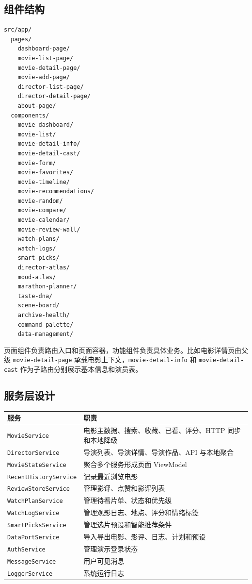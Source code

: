 \documentclass[
]{ctexart}
\begin{document}
\hypertarget{ux7ec4ux4ef6ux7ed3ux6784}{%
\subsection{组件结构}\label{ux7ec4ux4ef6ux7ed3ux6784}}

\begin{verbatim}
src/app/
  pages/
    dashboard-page/
    movie-list-page/
    movie-detail-page/
    movie-add-page/
    director-list-page/
    director-detail-page/
    about-page/
  components/
    movie-dashboard/
    movie-list/
    movie-detail-info/
    movie-detail-cast/
    movie-form/
    movie-favorites/
    movie-timeline/
    movie-recommendations/
    movie-random/
    movie-compare/
    movie-calendar/
    movie-review-wall/
    watch-plans/
    watch-logs/
    smart-picks/
    director-atlas/
    mood-atlas/
    marathon-planner/
    taste-dna/
    scene-board/
    archive-health/
    command-palette/
    data-management/
\end{verbatim}

页面组件负责路由入口和页面容器，功能组件负责具体业务。比如电影详情页由父级
\texttt{movie-detail-page} 承载电影上下文，\texttt{movie-detail-info} 和
\texttt{movie-detail-cast} 作为子路由分别展示基本信息和演员表。

\hypertarget{ux670dux52a1ux5c42ux8bbeux8ba1}{%
\subsection{服务层设计}\label{ux670dux52a1ux5c42ux8bbeux8ba1}}

\begin{longtable}[]{@{}ll@{}}
\toprule
服务 & 职责 \\
\midrule
\endhead
\texttt{MovieService} & 电影主数据、搜索、收藏、已看、评分、HTTP
同步和本地降级 \\
\texttt{DirectorService} & 导演列表、导演详情、导演作品、API
与本地聚合 \\
\texttt{MovieStateService} & 聚合多个服务形成页面 ViewModel \\
\texttt{RecentHistoryService} & 记录最近浏览电影 \\
\texttt{ReviewStoreService} & 管理影评、点赞和影评列表 \\
\texttt{WatchPlanService} & 管理待看片单、状态和优先级 \\
\texttt{WatchLogService} & 管理观影日志、地点、评分和情绪标签 \\
\texttt{SmartPicksService} & 管理选片预设和智能推荐条件 \\
\texttt{DataPortService} & 导入导出电影、影评、日志、计划和预设 \\
\texttt{AuthService} & 管理演示登录状态 \\
\texttt{MessageService} & 用户可见消息 \\
\texttt{LoggerService} & 系统运行日志 \\
\bottomrule
\end{longtable}
\end{document}
